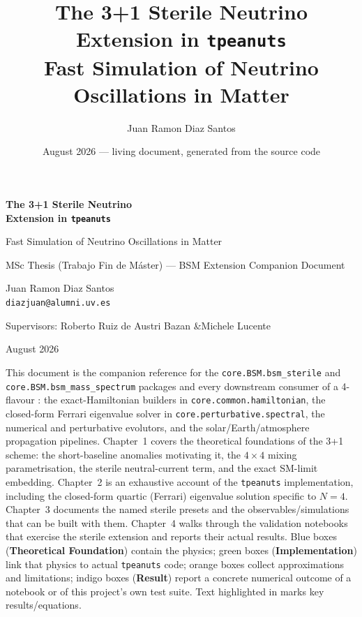\documentclass[11pt,a4paper,openany]{report}
\title{\Huge The 3+1 Sterile Neutrino Extension in \texttt{tpeanuts}\\[4pt]
  \Large Fast Simulation of Neutrino Oscillations in Matter}
\author{Juan Ramon Diaz Santos}
\date{August 2026 --- living document, generated from the source code}
\begin{document}
\begin{titlepage}
  \centering
  \vspace*{1.6cm}
  {\Huge\bfseries\color{sterileColor} The 3+1 Sterile Neutrino\\[4pt] Extension in \texttt{tpeanuts}\par}
  \vspace{0.8cm}
  {\Large Fast Simulation of Neutrino Oscillations in Matter\par}
  \vspace{1.5cm}
  {\large MSc Thesis (Trabajo Fin de M\'aster) --- BSM Extension Companion Document\par}
  \vspace{0.3cm}
  {\large Juan Ramon Diaz Santos \\ \texttt{diazjuan@alumni.uv.es}\par}
  \vspace{0.6cm}
  {\normalsize Supervisors: Roberto Ruiz de Austri Bazan \quad\&\quad Michele Lucente\par}
  \vfill
  {\normalsize August 2026\par}
  \vspace{0.5cm}
  \begin{tcolorbox}[colback=sterileColor!5,colframe=sterileColor,width=0.85\textwidth,sharp corners=all,rounded corners=all,arc=1mm]
    \small
    This document is the companion reference for the \texttt{core.BSM.bsm\_sterile} and
    \texttt{core.BSM.bsm\_mass\_spectrum} packages and every downstream consumer of a 4-flavour
    : the exact-Hamiltonian builders in
    \texttt{core.common.hamiltonian}, the closed-form Ferrari eigenvalue solver in
    \texttt{core.perturbative.spectral}, the numerical and perturbative evolutors, and the
    solar/Earth/atmosphere propagation pipelines. Chapter~1 covers the theoretical foundations of
    the 3+1 scheme: the short-baseline anomalies motivating it, the $4\times4$ mixing
    parametrisation, the sterile neutral-current term, and the exact SM-limit embedding.
    Chapter~2 is an exhaustive account of the \texttt{tpeanuts} implementation, including the
    closed-form quartic (Ferrari) eigenvalue solution specific to $N=4$. Chapter~3 documents the
    named sterile presets and the observables/simulations that can be built with them. Chapter~4
    walks through the validation notebooks that exercise the sterile extension and reports their
    actual results. Blue boxes (\textbf{Theoretical Foundation}) contain the physics; green boxes
    (\textbf{Implementation}) link that physics to actual \texttt{tpeanuts} code; orange boxes
    collect approximations and limitations; indigo boxes (\textbf{Result}) report a concrete
    numerical outcome of a notebook or of this project's own test suite. Text highlighted in
     marks key results/equations.
  \end{tcolorbox}
\end{titlepage}
\end{document}
